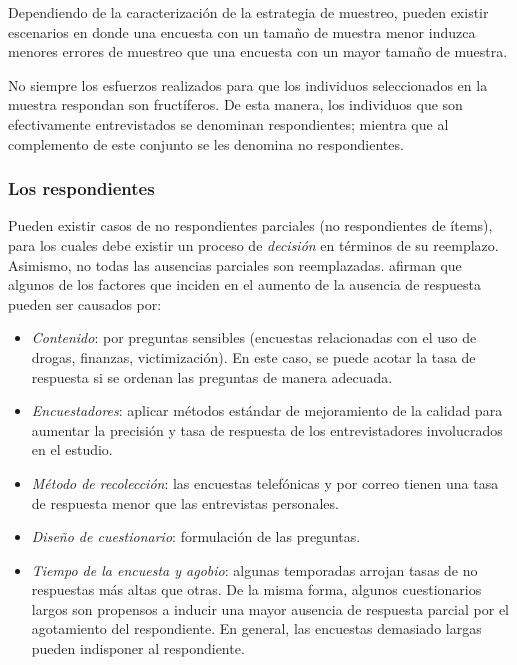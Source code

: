 \documentclass[
  10pt,
  spanish,
]{book}
\providecommand{\tightlist}{%
  \setlength{\itemsep}{0pt}\setlength{\parskip}{0pt}}
\begin{document}
Dependiendo de la caracterización de la estrategia de muestreo, pueden existir escenarios en donde una encuesta con un tamaño de muestra menor induzca menores errores de muestreo que una encuesta con un mayor tamaño de muestra.

No siempre los esfuerzos realizados para que los individuos seleccionados en la muestra respondan son fructíferos. De esta manera, los individuos que son efectivamente entrevistados se denominan respondientes; mientra que al complemento de este conjunto se les denomina no respondientes.

\hypertarget{los-respondientes}{%
\subsubsection*{Los respondientes}\label{los-respondientes}}

Pueden existir casos de no respondientes parciales (no respondientes de ítems), para los cuales debe existir un proceso de \emph{decisión} en términos de su reemplazo. Asimismo, no todas las ausencias parciales son reemplazadas. \citet{Groves_Fowler_Couper_Lepkowski_Singer_Tourangeau_2009} afirman que algunos de los factores que inciden en el aumento de la ausencia de respuesta pueden ser causados por:

\begin{itemize}
\tightlist
\item
  \emph{Contenido}: por preguntas sensibles (encuestas relacionadas con el uso de drogas, finanzas, victimización). En este caso, se puede acotar la tasa de respuesta si se ordenan las preguntas de manera adecuada.
\item
  \emph{Encuestadores}: aplicar métodos estándar de mejoramiento de la calidad para aumentar la precisión y tasa de respuesta de los entrevistadores involucrados en el estudio.
\item
  \emph{Método de recolección}: las encuestas telefónicas y por correo tienen una tasa de respuesta menor que las entrevistas personales.
\item
  \emph{Diseño de cuestionario}: formulación de las preguntas.
\item
  \emph{Tiempo de la encuesta y agobio}: algunas temporadas arrojan tasas de no respuestas más altas que otras. De la misma forma, algunos cuestionarios largos son propensos a inducir una mayor ausencia de respuesta parcial por el agotamiento del respondiente. En general, las encuestas demasiado largas pueden indisponer al respondiente.
\end{itemize}
\end{document}
